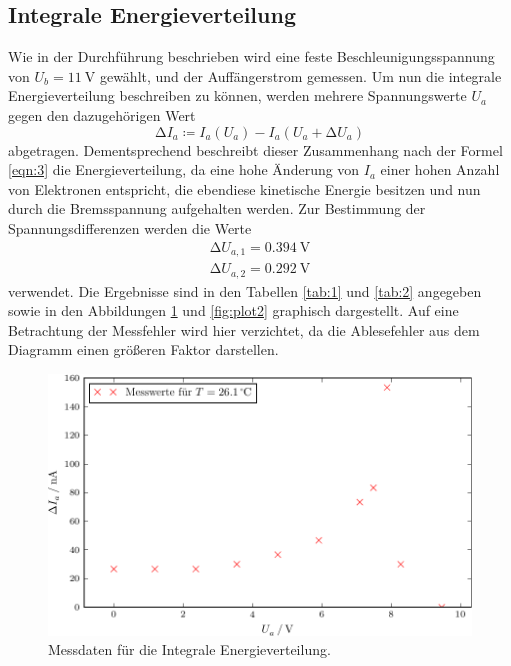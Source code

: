 \subsection{Integrale Energieverteilung}
\label{sec:ie}
Wie in der Durchführung beschrieben wird eine feste Beschleunigungsspannung von $U_b = \SI{11}{\volt}$ gewählt, und der Auffängerstrom gemessen.
Um nun die integrale Energieverteilung beschreiben zu können, werden mehrere Spannungswerte $U_a$ gegen den dazugehörigen Wert
\begin{equation}
  \increment I_a \coloneq I_a(U_a) - I_a(U_a + \increment U_a)
\end{equation}
abgetragen.
Dementsprechend beschreibt dieser Zusammenhang nach der Formel \eqref{eqn:3} die Energieverteilung, da eine hohe Änderung von $I_a$ einer hohen Anzahl von Elektronen entspricht, die ebendiese kinetische Energie besitzen und nun durch die Bremsspannung aufgehalten werden.
Zur Bestimmung der Spannungsdifferenzen werden die Werte
\begin{align*}
  \increment U_{a,1} = \SI{0,394}{\volt} \\
  \increment U_{a,2} = \SI{0.292}{\volt}
\end{align*}
verwendet.
Die Ergebnisse sind in den Tabellen \ref{tab:1} und \ref{tab:2} angegeben sowie in den Abbildungen \ref{fig:plot1} und \ref{fig:plot2} graphisch dargestellt.
Auf eine Betrachtung der Messfehler wird hier verzichtet, da die Ablesefehler aus dem Diagramm einen größeren Faktor darstellen.




\begin{figure}[H]
  \centering
  \includegraphics{build/aufgabenteil_a_plot.pdf}
  \caption{Messdaten für die Integrale Energieverteilung.}
  \label{fig:plot1}
\end{figure}

